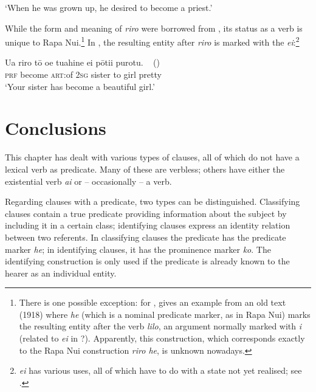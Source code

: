 \glt 
‘When he was grown up, he desired to become a priest.’ \textstyleExampleref{[R231.004]} 
\z

While the form and meaning of \textit{riro} were borrowed from , its status as a  verb is unique to Rapa Nui.\footnote{\label{fn:482}There is one possible exception: for , \citet[63]{Cook1999} gives an example from an old text (1918) where \textit{he} (which is a nominal predicate marker, as in Rapa Nui) marks the resulting entity after the verb \textit{lilo}, an argument normally marked with \textit{i} (related to  \textit{{\ꞌ}ei} in ?). Apparently, this construction, which corresponds exactly to the Rapa Nui construction \textit{riro he}, is unknown nowadays.} In , the resulting entity after \textit{riro} is marked with the  \textit{{\ꞌ}ei}:\footnote{\label{fn:483} \textit{{\ꞌ}ei} has various uses, all of which have to do with a state not yet realised; see \citet[364–365]{AcadémieTahitienne1986}.}

\ea\label{ex:9.110}
\gll {\ꞌ}Ua riro tō {\ꞌ}oe tuahine {\ꞌ}ei pōti{\ꞌ}i purotu. ~ \textup{()}\\
\textsc{prf} become \textsc{art}:of \textsc{2sg} sister to girl pretty \\

\glt 
‘Your sister has become a beautiful girl.’  
\z
{}

\section{Conclusions}\label{sec:9.7}

This chapter has dealt with various types of clauses, all of which do not have a lexical verb as predicate. Many of these are verbless; others have either the existential verb \textit{ai} or – occasionally – a  verb.

Regarding clauses with a  predicate, two types can be distinguished. Classifying clauses contain a true predicate providing information about the subject by including it in a certain class; identifying clauses express an identity relation between two referents. In classifying clauses the predicate has the predicate marker \textit{he}; in identifying clauses, it has the prominence marker \textit{ko}. The identifying construction is only used if the predicate is already known to the hearer as an individual entity.

